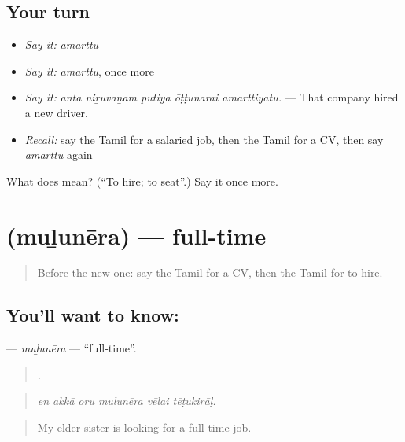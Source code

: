 \subsection*{Your turn}
\begin{itemize}
\raggedright
  \item \emph{Say it:} \emph{amarttu}
  \item \emph{Say it:} \emph{amarttu}, once more
  \item \emph{Say it:} \emph{anta niṟuvaṉam putiya ōṭṭunarai amarttiyatu.} — That company hired a new driver.
  \item \emph{Recall:} say the Tamil for a salaried job, then the Tamil for a CV, then say \emph{amarttu} again
\end{itemize}

\begin{tcolorbox}[breakable,colback=teal!4,colframe=teal!35!black,title={Before you move on}]
What does  mean? (\textquotedblleft{}To hire; to seat\textquotedblright{}.) Say it once more.
\end{tcolorbox}
\section[\texorpdfstring{\ta{முழுநேர} (muḻunēra)}{முழுநேர (muḻunēra)}]{ (muḻunēra) — full-time}

\label{lesson:TA-C506-mulunera}



\begin{quote}
Before the new one: say the Tamil for a CV, then the Tamil for to hire.
\end{quote}

\subsection*{You'll want to know: }
\textbf{} — \emph{muḻunēra} — \textquotedblleft{}full-time\textquotedblright{}.

\begin{quote}
     .
\end{quote}

\begin{quote}
\emph{eṉ akkā oru muḻunēra vēlai tēṭukiṟāḷ.}
\end{quote}

\begin{quote}
My elder sister is looking for a full-time job.
\end{quote}

